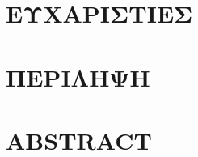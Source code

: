 \maketitle

\frontmatter

	\chapter{ΕΥΧΑΡΙΣΤΙΕΣ}
	\newpage

	\chapter{ΠΕΡΙΛΗΨΗ}
	\newpage

	\chapter{ABSTRACT}
	\newpage


	\tableofcontents
	\newpage

	\listoffigures
	\listoftables
